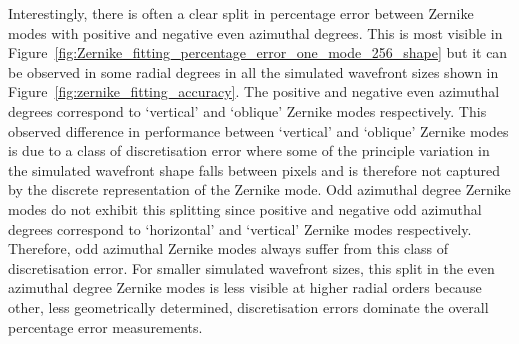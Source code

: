 Interestingly, there is often a clear split in percentage error between 
Zernike modes with positive and negative even azimuthal degrees. This is most 
visible in 
Figure~\ref{fig:Zernike_fitting_percentage_error_one_mode_256_shape} but it 
can be observed in some radial degrees in all the simulated wavefront sizes 
shown in Figure~\ref{fig:zernike_fitting_accuracy}. The positive and negative 
even azimuthal degrees correspond to `vertical' and `oblique' Zernike modes 
respectively. This observed difference in performance between `vertical' and 
`oblique' Zernike modes is due to a class of discretisation error where some 
of the principle variation in the simulated wavefront shape falls between 
pixels and is therefore not captured by the discrete representation of the 
Zernike mode. Odd azimuthal degree Zernike modes do not exhibit this 
splitting since positive and negative odd azimuthal degrees correspond to 
`horizontal' and `vertical' Zernike modes respectively. Therefore, odd 
azimuthal Zernike modes always suffer from this class of discretisation 
error. For smaller simulated wavefront sizes, this split in the even 
azimuthal degree Zernike modes is less visible at higher radial orders 
because other, less geometrically determined, discretisation errors dominate 
the overall percentage error measurements.

